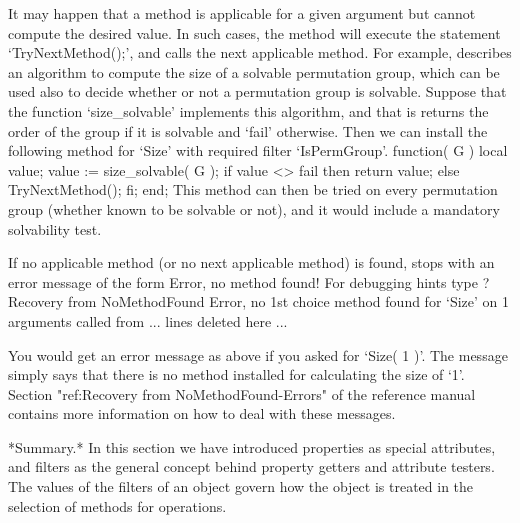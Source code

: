 It may happen that a method is applicable for a given argument
but cannot compute the desired value.
In such cases, the method will execute the statement `TryNextMethod();',
and {\GAP} calls the next applicable method.
For example, \cite{Sims90b} describes an algorithm to compute the size
of a solvable permutation group, which can be used also to decide
whether or not a permutation group is solvable.
Suppose that the function `size_solvable' implements this algorithm,
and that is returns the order of the group if it is solvable and
`fail' otherwise.
Then we can install the following method for `Size' with required
filter `IsPermGroup'.
\begintt
function( G )
local  value;
    value := size_solvable( G );
    if value <> fail  then  return value;
                      else  TryNextMethod();  fi;
end;
\endtt
This method can then be tried on every permutation group (whether known
to be  solvable or  not),  and it would  include a  mandatory solvability
test.

If no applicable method  (or no next applicable  method) is found, {\GAP}
stops with an error message of the form 
\begintt
Error, no method found! For debugging hints type ?Recovery from NoMethodFound
Error, no 1st choice method found for `Size' on 1 arguments called from
... lines deleted here ...
\endtt

You would get an error message as above if you asked for `Size( 1 )'. 
The message simply says that there is no method installed for calculating
the size of `1'. Section "ref:Recovery from NoMethodFound-Errors" of
the reference manual contains more information on how to deal with 
these messages.

*Summary.* In this section we have introduced properties as special
attributes, and filters as the general concept behind property getters
and attribute testers.
The values of the filters of an object govern how the object is treated
in the selection of methods for operations.

\null

